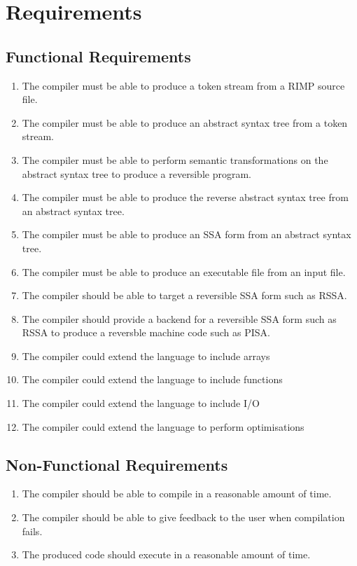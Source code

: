 \section*{Requirements}


\subsection*{Functional Requirements}

\begin{enumerate}
    \item The compiler must be able to produce a token stream from a RIMP source file.
    \item The compiler must be able to produce an abstract syntax tree from a token stream.
    \item The compiler must be able to perform semantic transformations on the abstract syntax tree to produce a reversible program.
    \item The compiler must be able to produce the reverse abstract syntax tree from an abstract syntax tree.
    \item The compiler must be able to produce an SSA form from an abstract syntax tree.
    \item The compiler must be able to produce an executable file from an input file.
    \item The compiler should be able to target a reversible SSA form such as RSSA.
    \item The compiler should provide a backend for a reversible SSA form such as RSSA to produce a reversble machine code such as PISA.
    \item The compiler could extend the language to include arrays
    \item The compiler could extend the language to include functions
    \item The compiler could extend the language to include I/O
    \item The compiler could extend the language to perform optimisations
\end{enumerate}


\subsection*{Non-Functional Requirements}

\begin{enumerate}
    \item The compiler should be able to compile in a reasonable amount of time.
    \item The compiler should be able to give feedback to the user when compilation fails.
    \item The produced code should execute in a reasonable amount of time.
\end{enumerate}

